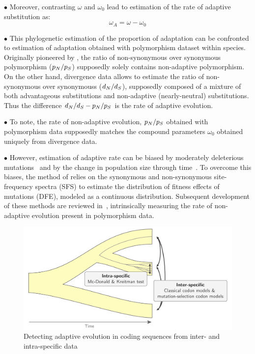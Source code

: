 $\bullet$ Moreover, contrasting $\omega$ and $\omega_0$ lead to estimation of the rate of adaptive \gls{substitution} as:
\begin{equation}
    \omega_A = \omega - \omega_0
\end{equation}

$\bullet$ This phylogenetic estimation of the proportion of adaptation can be confronted to estimation of adaptation obtained with polymorphism dataset within species.
Originally pioneered by \citet{McDonald1991}, the ratio of non-synonymous over synonymous polymorphism ($p_N / p_S$) supposedly solely contains non-adaptive polymorphism.
On the other hand, divergence data allows to estimate the ratio of non-synonymous over \glspl{synonymous} ($d_N / d_S$), supposedly composed of a mixture of both advantageous \glspl{substitution} and non-adaptive (\gls{nearly-neutral}) \glspl{substitution}.
Thus the difference $d_N / d_S - p_N / p_S $ is the rate of adaptive evolution.

$\bullet$ To note, the rate of non-adaptive evolution, $p_N / p_S$ obtained with polymorphism data supposedly matches the compound parameters $\omega_0$ obtained uniquely from divergence data.

$\bullet$ However, estimation of adaptive rate can be biased by moderately deleterious mutations~\citep{eyre-walker_quantifying_2002} and by the change in population size through time~\citep{eyre-walker_changing_2002}.
To overcome this biases, the method of \citet{Galtier2016} relies on the synonymous and non-synonymous site-frequency spectra (\acrshort{SFS}) to estimate the distribution of fitness effects of mutations (\acrshort{DFE}), modeled as a continuous distribution.
Subsequent development of these methods are reviewed in~\citep{Moutinho2019a}, intrinsically measuring the rate of non-adaptive evolution present in polymorphism data.

\begin{figure}[H]
	\centering
	\includegraphics[width=\textwidth] {figures/inter-intra}
	\caption{Detecting adaptive evolution in coding sequences from inter- and intra-specific data}
\end{figure}

